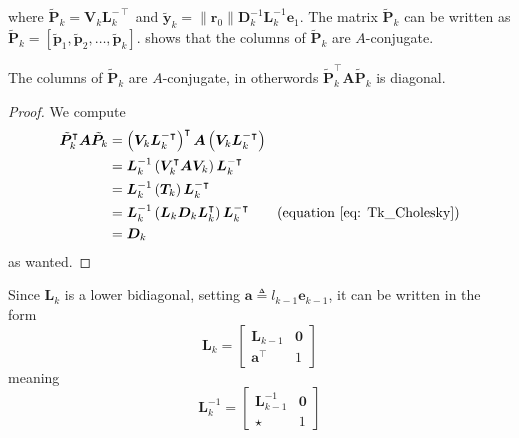 where $\tilde{\bm{P}}_k = \bm{V}_{k} \bm{L}_k^{-\intercal}$ and $\tilde{\bm{y}}_k = \| \bm{r}_0 \| \bm{D}_k^{-1} \bm{L}_k^{-1} \bm{e}_1$. The matrix $\tilde{\bm{P}}_k$ can be written as
$\tilde{\bm{P}}_k = \left[ \tilde{\bm{p}}_1 , \tilde{\bm{p}}_2 , \ldots , \tilde{\bm{p}}_k \right]$.  shows that the columns of $\tilde{\bm{P}}_k$ are $A$-conjugate.

\begin{lem} \label{lemma: Pk_cols_A_conj}
    The columns of $\tilde{\bm{P}}_k$ are $A$-conjugate, in otherwords $\tilde{\bm{P}}_k^{\intercal} \bm{A} \tilde{\bm{P}}_k$ is diagonal.
\end{lem}

\begin{proof}
    We compute
    \begin{align*}
        \tilde{\bm{P}}_k^{\intercal} \bm{A} \tilde{\bm{P}}_k
         & = \left( \bm{V}_{k} \bm{L}_k^{-\intercal} \right)^{\intercal} \bm{A} \left( \bm{V}_{k} \bm{L}_k^{-\intercal} \right)             \\
         & = \bm{L}_k^{-1} \left( \bm{V}_{k}^{\intercal} \bm{A} \bm{V}_{k} \right) \bm{L}_k^{-\intercal}                                    \\
         & = \bm{L}_k^{-1} \left( \bm{T}_k \right) \bm{L}_k^{-\intercal}                                                                    \\
         & = \bm{L}_k^{-1} \left( \bm{L}_k \bm{D}_k \bm{L}_k^{\intercal} \right) \bm{L}_k^{-\intercal} \tag{equation \ref{eq: Tk_Cholesky}} \\
         & = \bm{D}_k
    \end{align*}
    as wanted.
\end{proof}

Since $\bm{L}_k$ is a lower bidiagonal, setting $\bm{a} \triangleq l_{k-1} \bm{e}_{k-1}$, it can be written in the form
\[
    \bm{L}_k =
    \begin{bmatrix}
        \bm{L}_{k-1}       & \bm{0} \\
        \bm{a}^{\intercal} & 1
    \end{bmatrix}
\]
meaning
\[
    \bm{L}_k^{-1} =
    \begin{bmatrix}
        \bm{L}_{k-1}^{-1} & \bm{0} \\
        \star             & 1
    \end{bmatrix}
\]

